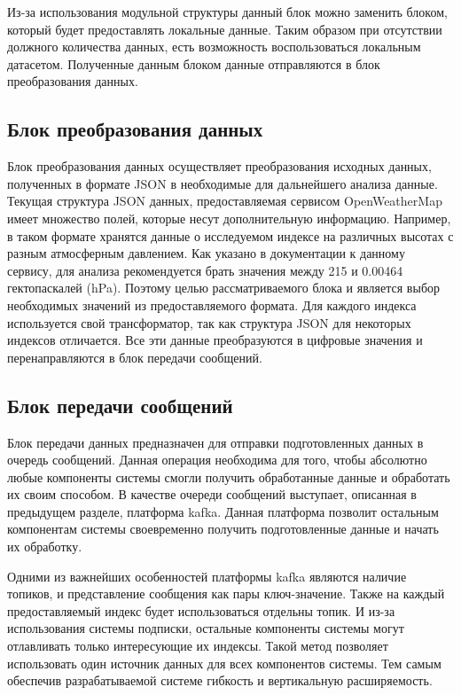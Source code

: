 Из-за использования модульной структуры данный блок можно заменить блоком, который будет предоставлять локальные данные.
Таким образом при отсутствии должного количества данных, есть возможность воспользоваться локальным датасетом.
Полученные данным блоком данные отправляются в блок преобразования данных.

\subsection{Блок преобразования данных}

Блок преобразования данных осуществляет преобразования исходных данных, полученных в формате JSON в необходимые для дальнейшего анализа данные.
Текущая структура JSON данных, предоставляемая сервисом OpenWeatherMap имеет множество полей, которые несут дополнительную информацию.
Например, в таком формате хранятся данные о исследуемом индексе на различных высотах с разным атмосферным давлением.
Как указано в документации к данному сервису, для анализа рекомендуется брать значения между 215 и 0.00464 гектопаскалей (hPa).
Поэтому целью рассматриваемого блока и является выбор необходимых значений из предоставляемого формата.
Для каждого индекса используется свой трансформатор, так как структура JSON для некоторых индексов отличается.
Все эти данные преобразуются в цифровые значения и перенаправляются в блок передачи сообщений.

\subsection{Блок передачи сообщений}

Блок передачи данных предназначен для отправки подготовленных данных в очередь сообщений.
Данная операция необходима для того, чтобы абсолютно любые компоненты системы смогли получить обработанные данные и обработать их своим способом.
В качестве очереди сообщений выступает, описанная в предыдущем разделе, платформа kafka.
Данная платформа позволит остальным компонентам системы своевременно получить подготовленные данные и начать их обработку.

Одними из важнейших особенностей платформы kafka являются наличие топиков, и представление сообщения как пары ключ-значение.
Также на каждый предоставляемый индекс будет использоваться отдельны топик.
И из-за использования системы подписки, остальные компоненты системы могут отлавливать только интересующие их индексы.
Такой метод позволяет использовать один источник данных для всех компонентов системы.
Тем самым обеспечив разрабатываемой системе гибкость и вертикальную расширяемость.

